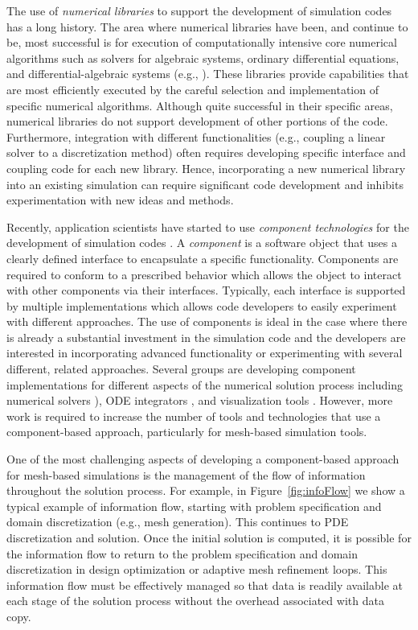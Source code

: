 The use of {\it numerical libraries} to support the development of
simulation codes has a long history. The area where numerical
libraries have been, and continue to be, most successful is for
execution of computationally intensive core numerical algorithms such
as solvers for algebraic systems, ordinary differential equations, and
differential-algebraic systems (e.g.,
\cite{AsPe98,petsc,BaGr97,eispack,lapack,linpack}). These libraries
provide capabilities that are most efficiently executed by the careful
selection and implementation of specific numerical
algorithms. Although quite successful in their specific areas,
numerical libraries do not support development of other portions of
the code.  Furthermore, integration with different functionalities
(e.g., coupling a linear solver to a discretization method) often
requires developing specific interface and coupling code for each new
library.  Hence, incorporating a new numerical library into
an existing simulation can require significant
code development and inhibits experimentation with new ideas and
methods.

Recently, application scientists have started to use {\it component
technologies} for the development of simulation codes 
\cite{keahey00ligature,ccachem,Larson:2004:CCO,mit2003,ipdps2003,norris02,SGP:Parker02,Zhou:2003:PEC}.
A {\it component} is a software object that uses a clearly defined
interface to encapsulate a specific functionality.  Components are
required to conform to a prescribed behavior which allows the object
to interact with other components via their interfaces.  Typically,
each interface is supported by multiple implementations which allows
code developers to easily experiment with different approaches.  The
use of components is ideal in the case where there is already a
substantial investment in the simulation code and the developers are
interested in incorporating advanced functionality or experimenting
with several different, related approaches.  Several groups are
developing component implementations for different aspects of the
numerical solution process including numerical solvers
\cite{petsc,BaGr97}), ODE integrators \cite{ipdps2004:odepackpp,cvode_sandia_report}, 
and visualization tools
\cite{cca-paper}.  However, more work is required to increase the
number of tools and technologies that use a component-based approach,
particularly for mesh-based simulation tools.

One of the most challenging aspects of developing a component-based
approach for mesh-based simulations is the management of the flow of
information throughout the solution process. For example, in
Figure~\ref{fig:infoFlow} we show a typical example of information
flow, starting with problem specification and domain discretization
(e.g., mesh generation).  This continues to PDE discretization and
solution.  Once the initial solution is computed, it is possible for
the information flow to return to the problem specification and domain
discretization in design optimization or adaptive mesh refinement
loops.  This information flow must be effectively managed so that data
is readily available at each stage of the solution process without the
overhead associated with data copy.

